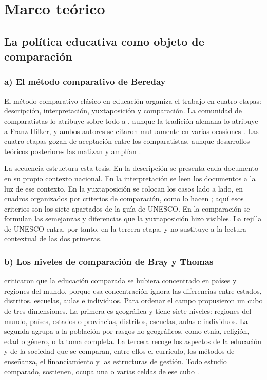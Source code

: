 \section{Marco teórico}
\label{sec:marco-teorico}

\subsection{La política educativa como objeto de comparación}
\label{subsec:mt-comparacion}

\subsubsection*{a) El método comparativo de Bereday}

El método comparativo clásico en educación organiza el trabajo en cuatro etapas:
descripción, interpretación, yuxtaposición y comparación. La comunidad de comparatistas lo
atribuye sobre todo a \citet{bereday1964comparative}, aunque la tradición alemana lo
atribuye a Franz Hilker, y ambos autores se citaron mutuamente en varias ocasiones
\citep{adick2018bereday}. Las cuatro etapas gozan de aceptación entre los comparatistas,
aunque desarrollos teóricos posteriores las matizan y amplían
\citep[p.~25]{senent2016iniciacion}.

La secuencia estructura esta tesis. En la descripción se presenta cada documento en su
propio contexto nacional. En la interpretación se leen los documentos a la luz de ese
contexto. En la yuxtaposición se colocan los casos lado a lado, en cuadros organizados por
criterios de comparación, como lo hacen \citet[p.~25]{senent2016iniciacion}; aquí esos
criterios son los siete apartados de la guía de UNESCO. En la comparación se formulan las
semejanzas y diferencias que la yuxtaposición hizo visibles. La rejilla de UNESCO entra,
por tanto, en la tercera etapa, y no sustituye a la lectura contextual de las dos primeras.

\subsubsection*{b) Los niveles de comparación de Bray y Thomas}

\citet{bray1995levels} criticaron que la educación comparada se hubiera concentrado en
países y regiones del mundo, porque esa concentración ignora las diferencias entre
estados, distritos, escuelas, aulas e individuos. Para ordenar el campo propusieron un
cubo de tres dimensiones. La primera es geográfica y tiene siete niveles: regiones del
mundo, países, estados o provincias, distritos, escuelas, aulas e individuos. La segunda
agrupa a la población por rasgos no geográficos, como etnia, religión, edad o género, o la
toma completa. La tercera recoge los aspectos de la educación y de la sociedad que se
comparan, entre ellos el currículo, los métodos de enseñanza, el financiamiento y las
estructuras de gestión. Todo estudio comparado, sostienen, ocupa una o varias celdas de ese
cubo \citep[p.~474]{bray1995levels}.

